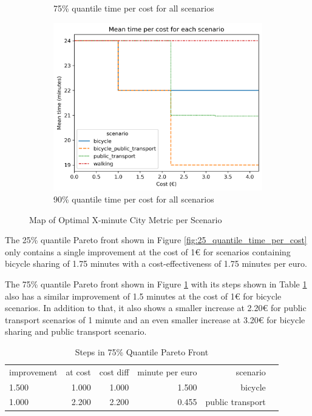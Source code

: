 \begin{figure}
\begin{subfigure}[b]{0.48\textwidth}
         \caption{75\% quantile time per cost for all scenarios}
         \label{fig:75_quantile_time_per_cost}
     \end{subfigure}
     \hfill
     \begin{subfigure}[b]{0.48\textwidth}
         \centering
         \includegraphics[width=\textwidth]{Figures/results/metric_cost/quantile_90_time_per_cost_for_each_scenario_without_car.png}
         \caption{90\% quantile time per cost for all scenarios}
         \label{fig:90_quantile_time_per_cost}
     \end{subfigure}
        \caption{Map of Optimal X-minute City Metric per Scenario}
        \label{fig:quantile_time_per_cost}
\end{figure}

The 25\% quantile Pareto front shown in Figure \ref{fig:25_quantile_time_per_cost} only contains a single improvement at the cost of 1€ for scenarios containing bicycle sharing of 1.75 minutes with a cost-effectiveness of 1.75 minutes per euro.


The 75\% quantile Pareto front shown in Figure \ref{fig:75_quantile_time_per_cost} with its steps shown in Table \ref{tab:differences_in_75_quantile_pareto_front} also has a similar improvement of 1.5 minutes at the cost of 1€ for bicycle scenarios.
In addition to that, it also shows a smaller increase at 2.20€ for public transport scenarios of 1 minute and an even smaller increase at 3.20€ for bicycle sharing and public transport scenario.

\begin{table}
  \caption{Steps in 75\% Quantile Pareto Front}
  \label{tab:differences_in_75_quantile_pareto_front}
  \begin{center}
    \begin{tabular}{lrrrrl}
     improvement & at cost & cost diff & minute per euro & scenario \\
     1.500 & 1.000 & 1.000 & 1.500 & bicycle \\
     1.000 & 2.200 & 2.200 & 0.455 & public transport \\
    \end{tabular}
  \end{center}
\end{table}


